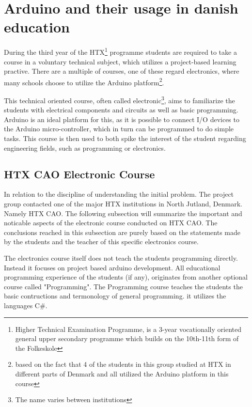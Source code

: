 % 

\section{Arduino and their usage in danish education}
During the third year of the HTX\footnote{Higher Technical Examination Programme, is a 3-year vocationally oriented general upper secondary programme which builds on the 10th-11th form of the Folkeskole\cite{htx_wiki}} programme students are required to take a course in a voluntary technical subject, which utilizes a project-based learning practive. 
There are a multiple of courses, one of these regard electronics, where many schools choose to utilize the Arduino platform\footnote{based on the fact that 4 of the students in this group studied at HTX in different parts of Denmark and all utilized the Arduino platform in this course}\cite{holstebro_education}.  

This technical oriented course, often called electronic\footnote{The name varies between institutions}, aims to familiarize the students with electrical components and circuits as well as basic programming.\cite{holstebro_electronic}
Arduino is an ideal platform for this, as it is possible to connect I/O devices to the Arduino micro-controller, which in turn can be programmed to do simple tasks. 
This course is then used to both spike the interest of the student regarding engineering fields, such as programming or electronics.

\subsection{HTX CAO Electronic Course}
In relation to the discipline of understanding the initial problem. The project group contacted one of the major HTX institutions in North Jutland, Denmark. Namely HTX CAO. The following subsection will summarize the important and noticable aspects of the electronic course conducted on HTX CAO. The conclusions reached in this subsection are purely based on the statements made by the students and the teacher of this specific electronics course.

The electronics course itself does not teach the students programming directly. Instead it focuses on project based arduino development. All educational programming experience of the students (if any), originates from another optional course called "Programming". The Programming course teaches the students the basic contructions and termonology of general programming. it utilizes the languages C{\#}. 

